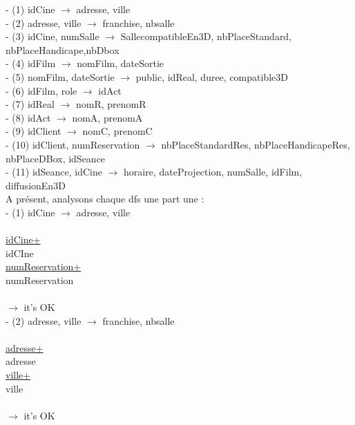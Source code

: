 \documentclass[a4paper,sffamily,12pt]{article}
\begin{document}
						\noindent- (1) idCine $\rightarrow$ adresse, ville \\
						- (2) adresse, ville $\rightarrow$ franchise, nbsalle \\
						- (3) idCine, numSalle $\rightarrow$ SallecompatibleEn3D, nbPlaceStandard, nbPlaceHandicape,nbDbox \\
				 		- (4) idFilm $\rightarrow$ nomFilm, dateSortie \\
						- (5) nomFilm, dateSortie $\rightarrow$ public, idReal, duree, compatible3D \\
						- (6) idFilm, role $\rightarrow$  idAct \\
						- (7) idReal $\rightarrow$ nomR, prenomR \\
						- (8) idAct $\rightarrow$ nomA, prenomA \\
						- (9) idClient $\rightarrow$ nomC, prenomC \\
						- (10) idClient, numReservation $\rightarrow$ nbPlaceStandardRes, nbPlaceHandicapeRes, nbPlaceDBox, idSeance \\
						- (11) idSeance, idCine $\rightarrow$ horaire, dateProjection, numSalle, idFilm, diffusionEn3D \\
						
						A présent, analysons chaque dfs une part une : \\
						
						\noindent - (1) idCine $\rightarrow$ adresse, ville \\
							\\
							\underline{idCine+} \\
							idCIne\\
							\underline{numReservation+} \\
							numReservation \\	
							\\									
						$\rightarrow$ it's OK \\		
							
						\noindent - (2) adresse, ville $\rightarrow$ franchise, nbsalle \\
							\\
							\underline{adresse+} \\
							adresse\\
							\underline{ville+} \\
							ville \\	
							\\									
						$\rightarrow$ it's OK \\
						
\end{document}
